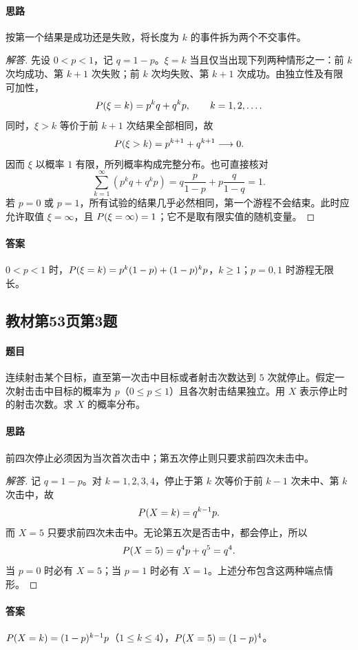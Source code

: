 \paragraph{思路} 按第一个结果是成功还是失败，将长度为 $k$ 的事件拆为两个不交事件。
\begin{proof}[解答]
先设 $0<p<1$，记 $q=1-p$。$\xi=k$ 当且仅当出现下列两种情形之一：前 $k$ 次均成功、第 $k+1$ 次失败；前 $k$ 次均失败、第 $k+1$ 次成功。由独立性及有限可加性，
\[
\P(\xi=k)=p^kq+q^kp,\qquad k=1,2,\ldots.
\]
同时，$\xi>k$ 等价于前 $k+1$ 次结果全部相同，故
\[
\P(\xi>k)=p^{k+1}+q^{k+1}\longrightarrow0.
\]
因而 $\xi$ 以概率 $1$ 有限，所列概率构成完整分布。也可直接核对
\[
\sum_{k=1}^{\infty}(p^kq+q^kp)=q\frac{p}{1-p}+p\frac{q}{1-q}=1.
\]
若 $p=0$ 或 $p=1$，所有试验的结果几乎必然相同，第一个游程不会结束。此时应允许取值 $\xi=\infty$，且 $\P(\xi=\infty)=1$；它不是取有限实值的随机变量。
\end{proof}
\paragraph{答案} $0<p<1$ 时，$\P(\xi=k)=p^k(1-p)+(1-p)^kp$，$k\geq1$；$p=0,1$ 时游程无限长。

\subsection{教材第53页第3题}\label{ex:w07-b53-3}
\paragraph{题目}
连续射击某个目标，直至第一次击中目标或者射击次数达到 $5$ 次就停止。假定一次射击击中目标的概率为 $p$（$0\leq p\leq1$）且各次射击结果独立。用 $X$ 表示停止时的射击次数。求 $X$ 的概率分布。
\paragraph{思路} 前四次停止必须因为当次首次击中；第五次停止则只要求前四次未击中。
\begin{proof}[解答]
记 $q=1-p$。对 $k=1,2,3,4$，停止于第 $k$ 次等价于前 $k-1$ 次未中、第 $k$ 次击中，故
\[
\P(X=k)=q^{k-1}p.
\]
而 $X=5$ 只要求前四次未击中。无论第五次是否击中，都会停止，所以
\[
\P(X=5)=q^4p+q^5=q^4.
\]
当 $p=0$ 时必有 $X=5$；当 $p=1$ 时必有 $X=1$。上述分布包含这两种端点情形。
\end{proof}
\paragraph{答案} $\P(X=k)=(1-p)^{k-1}p$（$1\leq k\leq4$），$\P(X=5)=(1-p)^4$。

